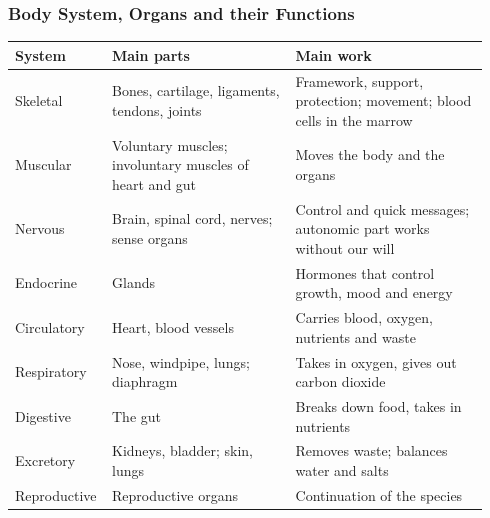 \begin{frame}[fragile]\frametitle{Body System, Organs and their Functions}

		\begin{center}
		{\scriptsize
		\begin{tabular}{@{}p{0.16\linewidth}p{0.38\linewidth}p{0.4\linewidth}@{}}
		\toprule
		\textbf{System} & \textbf{Main parts} & \textbf{Main work} \\
		\midrule
		Skeletal & Bones, cartilage, ligaments, tendons, joints & Framework, support, protection; movement; blood cells in the marrow \\
		Muscular & Voluntary muscles; involuntary muscles of heart and gut & Moves the body and the organs \\
		Nervous & Brain, spinal cord, nerves; sense organs & Control and quick messages; autonomic part works without our will \\
		Endocrine & Glands & Hormones that control growth, mood and energy \\
		Circulatory & Heart, blood vessels & Carries blood, oxygen, nutrients and waste \\
		Respiratory & Nose, windpipe, lungs; diaphragm & Takes in oxygen, gives out carbon dioxide \\
		Digestive & The gut & Breaks down food, takes in nutrients \\
		Excretory & Kidneys, bladder; skin, lungs & Removes waste; balances water and salts \\
		Reproductive & Reproductive organs & Continuation of the species \\
		\bottomrule
		\end{tabular}}
		\end{center}

\end{frame}

